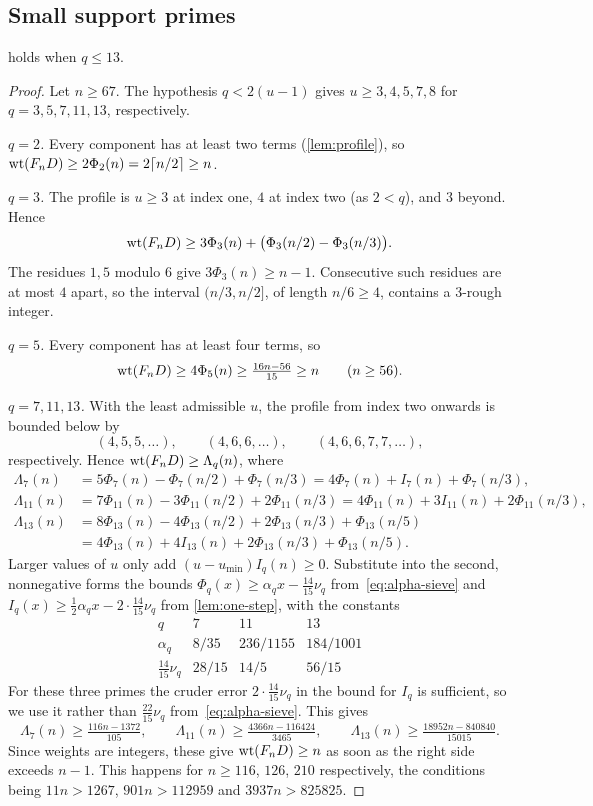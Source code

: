 \subsection{Small support primes}

\begin{proposition}\label{prop:small-q}
 holds when $q\le13$.
\end{proposition}

\begin{proof}
Let $n\ge67$. The hypothesis $q<2(u-1)$ gives $u\ge3,4,5,7,8$ for $q=3,5,7,11,13$, respectively.

\emph{$q=2$.} Every component has at least two terms (\cref{lem:profile}), so $\operatorname{wt}(F_nD)\ge2\Phi_2(n)=2\lceil n/2\rceil\ge n$.

\emph{$q=3$.} The profile is $u\ge3$ at index one, $4$ at index two (as $2<q$), and $3$ beyond. Hence
\[
 \operatorname{wt}(F_nD)\ge3\Phi_3(n)+\bigl(\Phi_3(n/2)-\Phi_3(n/3)\bigr).
\]
The residues $1,5$ modulo $6$ give $3\Phi_3(n)\ge n-1$. Consecutive such residues are at most $4$ apart, so the interval $(n/3,n/2]$, of length $n/6\ge4$, contains a $3$-rough integer.

\emph{$q=5$.} Every component has at least four terms, so
\[
 \operatorname{wt}(F_nD)\ge4\Phi_5(n)\ge\tfrac{16n-56}{15}\ge n\qquad(n\ge56).
\]

\emph{$q=7,11,13$.} With the least admissible $u$, the profile from index two onwards is bounded below by
\[
 (4,5,5,\dots),\qquad(4,6,6,\dots),\qquad(4,6,6,7,7,\dots),
\]
respectively. Hence $\operatorname{wt}(F_nD)\ge\Lambda_q(n)$, where
\begin{align*}
 \Lambda_7(n)&=5\Phi_7(n)-\Phi_7(n/2)+\Phi_7(n/3)=4\Phi_7(n)+I_7(n)+\Phi_7(n/3),\\
 \Lambda_{11}(n)&=7\Phi_{11}(n)-3\Phi_{11}(n/2)+2\Phi_{11}(n/3)=4\Phi_{11}(n)+3I_{11}(n)+2\Phi_{11}(n/3),\\
 \Lambda_{13}(n)&=8\Phi_{13}(n)-4\Phi_{13}(n/2)+2\Phi_{13}(n/3)+\Phi_{13}(n/5)\\
 &=4\Phi_{13}(n)+4I_{13}(n)+2\Phi_{13}(n/3)+\Phi_{13}(n/5).
\end{align*}
Larger values of $u$ only add $(u-u_{\min})I_q(n)\ge0$. Substitute into the second, nonnegative forms the bounds $\Phi_q(x)\ge\alpha_qx-\frac{14}{15}\nu_q$ from~\eqref{eq:alpha-sieve} and $I_q(x)\ge\frac12\alpha_qx-2\cdot\frac{14}{15}\nu_q$ from \cref{lem:one-step}, with the constants
\[
\begin{array}{c|ccc}
q&7&11&13\\\hline
\alpha_q&8/35&236/1155&184/1001\\
\tfrac{14}{15}\nu_q&28/15&14/5&56/15
\end{array}
\]
For these three primes the cruder error $2\cdot\frac{14}{15}\nu_q$ in the bound for $I_q$ is sufficient, so we use it rather than $\frac{22}{15}\nu_q$ from~\eqref{eq:alpha-sieve}. This gives
\[
 \Lambda_7(n)\ge\tfrac{116n-1372}{105},\qquad
 \Lambda_{11}(n)\ge\tfrac{4366n-116424}{3465},\qquad
 \Lambda_{13}(n)\ge\tfrac{18952n-840840}{15015}.
\]
Since weights are integers, these give $\operatorname{wt}(F_nD)\ge n$ as soon as the right side exceeds $n-1$. This happens for $n\ge116$, $126$, $210$ respectively, the conditions being $11n>1267$, $901n>112959$ and $3937n>825825$.


\end{proof}
